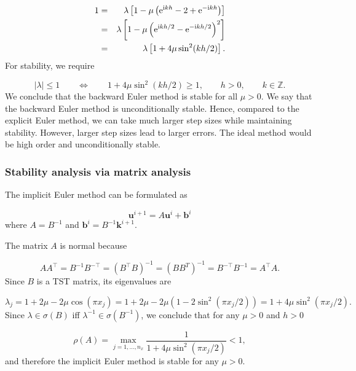 \documentclass[12pt,a4paper]{article}
\begin{document}
\begin{eqnarray*}
1 &=& \lambda\left[1 - \mu\left({\rm e}^{{\rm i}kh} - 2 + {\rm e}^{-{\rm i}kh} \right)\right] \\
&=& \lambda\left[1 - \mu\left({\rm e}^{{\rm i}kh/2} - {\rm e}^{-{\rm i}kh/2} \right)^2\right] \\
&=& \lambda\left[1 + 4\mu\sin^2(kh/2)\right].
\end{eqnarray*}
For stability, we require

\[
\vert \lambda \vert \leq 1 \qquad \Leftrightarrow \qquad 1 + 4\mu\sin^2(kh/2) \geq 1, \qquad h>0, \qquad k \in \mathbb{Z}.
\]
We conclude that the backward Euler method is stable for all $\mu > 0$.  We say that the backward Euler method is unconditionally stable.  Hence, compared to the explicit Euler method, we can take much larger step sizes while maintaining stability.   However, larger step sizes lead to larger errors.   The ideal method would be high order and unconditionally stable.

\subsubsection{Stability analysis via matrix analysis}
The implicit Euler method can be formulated as

\[
\mathbf{u}^{i+1} = A\mathbf{u}^i + \mathbf{b}^i
\]
where $A = B^{-1}$ and $\mathbf{b}^i = B^{-1}\mathbf{k}^{i+1}$.  

The matrix $A$ is normal because

\[
AA^{\top} = B^{-1}B^{-\top} = \left(B^{\top}B  \right)^{-1} = \left(B B^T  \right)^{-1} = B^{-\top}B^{-1} = A^{\top}A.
\]
Since $B$ is a TST matrix, its eigenvalues are

\[
\lambda_j = 1 + 2\mu - 2\mu\cos\left(\pi x_j  \right) = 1 + 2\mu -2\mu(1 - 2\sin^2(\pi x_j/2)) = 1 + 4\mu\sin^2(\pi x_j/2).
\]
Since $\lambda \in \sigma(B)$ iff $\lambda^{-1} \in \sigma(B^{-1})$, we conclude that for any $\mu > 0$ and $h > 0$ 

\[
\rho(A) = \max_{j = 1, \ldots, n_x} \frac{1}{1 + 4\mu \sin^2(\pi x_j/2)} < 1, 
\]
and therefore the implicit Euler method is stable for any $\mu > 0$.
\end{document}
